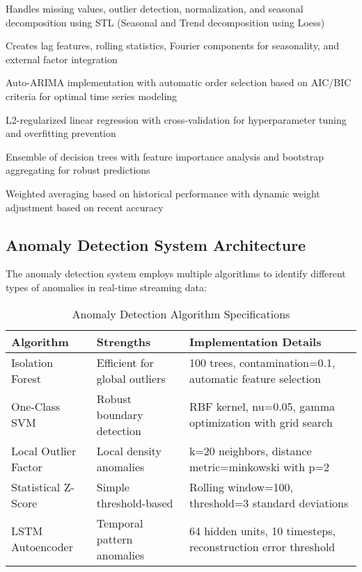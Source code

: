 \begin{description}[leftmargin=*]
    \item[Time Series Preprocessor] Handles missing values, outlier detection, normalization, and seasonal decomposition using STL (Seasonal and Trend decomposition using Loess)
    \item[Feature Engineering Pipeline] Creates lag features, rolling statistics, Fourier components for seasonality, and external factor integration
    \item[ARIMA Model] Auto-ARIMA implementation with automatic order selection based on AIC/BIC criteria for optimal time series modeling
    \item[Ridge Regression] L2-regularized linear regression with cross-validation for hyperparameter tuning and overfitting prevention
    \item[Random Forest] Ensemble of decision trees with feature importance analysis and bootstrap aggregating for robust predictions
    \item[Ensemble Voting] Weighted averaging based on historical performance with dynamic weight adjustment based on recent accuracy
\end{description}

\subsection{Anomaly Detection System Architecture}

The anomaly detection system employs multiple algorithms to identify different types of anomalies in real-time streaming data:

\begin{table}[H]
\centering
\caption{Anomaly Detection Algorithm Specifications}
\begin{tabular}{|p{3cm}|p{4cm}|p{5cm}|}
\hline
\textbf{Algorithm} & \textbf{Strengths} & \textbf{Implementation Details} \\
\hline
Isolation Forest & Efficient for global outliers & 100 trees, contamination=0.1, automatic feature selection \\
\hline
One-Class SVM & Robust boundary detection & RBF kernel, nu=0.05, gamma optimization with grid search \\
\hline
Local Outlier Factor & Local density anomalies & k=20 neighbors, distance metric=minkowski with p=2 \\
\hline
Statistical Z-Score & Simple threshold-based & Rolling window=100, threshold=3 standard deviations \\
\hline
LSTM Autoencoder & Temporal pattern anomalies & 64 hidden units, 10 timesteps, reconstruction error threshold \\
\hline
\end{tabular}
\end{table}

